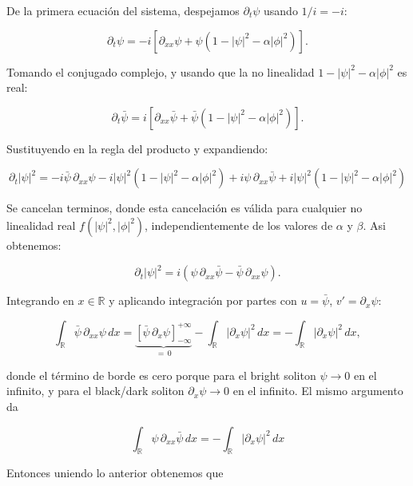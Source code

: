 \documentclass[letterpaper,11pt]{exam}
\theoremstyle{plain}
\begin{document}
De la primera ecuación del sistema, despejamos $\partial_t\psi$ usando 
$1/i = -i$:

\begin{equation*}
    \partial_t\psi = -i\left[\partial_{xx}\psi + 
    \psi(1-|\psi|^2-\alpha|\phi|^2)\right].
\end{equation*}

Tomando el conjugado complejo, y usando que la no linealidad 
$1-|\psi|^2-\alpha|\phi|^2$ es real:

\begin{equation*}
    \partial_t\bar\psi = i\left[\partial_{xx}\bar\psi + 
    \bar\psi(1-|\psi|^2-\alpha|\phi|^2)\right].
\end{equation*}

Sustituyendo en la regla del producto y expandiendo:

\begin{equation*}
    \partial_t|\psi|^2 = -i\bar\psi\,\partial_{xx}\psi 
    -i|\psi|^2(1-|\psi|^2-\alpha|\phi|^2) 
    + i\psi\,\partial_{xx}\bar\psi 
    +i|\psi|^2(1-|\psi|^2-\alpha|\phi|^2)
\end{equation*}


Se cancelan terminos, donde esta cancelación es válida para cualquier no linealidad real 
$f(|\psi|^2,|\phi|^2)$, independientemente de los valores de 
$\alpha$ y $\beta$. Asi obtenemos:

\begin{equation*}
    \partial_t|\psi|^2 = i\left(\psi\,\partial_{xx}\bar\psi 
    - \bar\psi\,\partial_{xx}\psi\right).
\end{equation*}

Integrando en $x \in \mathbb{R}$ y aplicando integración por partes 
con $u = \bar\psi$, $v' = \partial_x\psi$:

\begin{equation*}
    \int_{\mathbb{R}}\bar\psi\,\partial_{xx}\psi\,dx = 
    \underbrace{[\bar\psi\,\partial_x\psi]_{-\infty}^{+\infty}}_{=\,0} 
    - \int_{\mathbb{R}}|\partial_x\psi|^2\,dx 
    = -\int_{\mathbb{R}}|\partial_x\psi|^2\,dx,
\end{equation*}

donde el término de borde es cero porque para el bright soliton 
$\psi \to 0$ en el infinito, y para el black/dark soliton 
$\partial_x\psi \to 0$ en el infinito. El mismo argumento da

$$\int_{\mathbb{R}}\psi\,\partial_{xx}\bar\psi\,dx = 
-\int_{\mathbb{R}}|\partial_x\psi|^2\,dx$$

Entonces uniendo lo anterior obtenemos que
\end{document}
